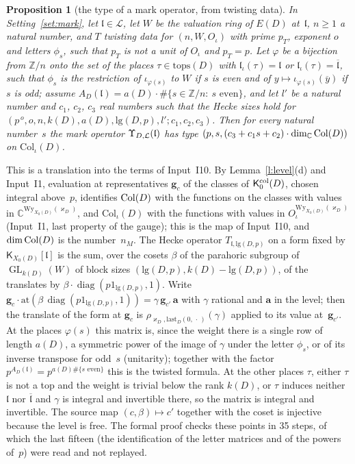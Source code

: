 \documentclass[11pt,a4paper]{article}
\makeatletter
\newcommand{\lean}[1]{\csname LN@#1\endcsname}
\newcommand{\Z}{\mathbb{Z}}
\newcommand{\diag}{\operatorname{diag}}
\newcommand{\leantag}{{\sffamily\bfseries\fontsize{6.3}{8}\selectfont\color{leancol}\addfontfeatures{LetterSpace=7}LEAN}}
\newcommand{\leanline}[1]{\par\nopagebreak\vspace{-2.5pt}{\fontsize{8.9}{12.4}\selectfont\color{inksoft}\raggedright
  \noindent\llap{\leantag\hspace{9pt}}#1\par}\vspace{1pt}}
\theoremstyle{plainx}
\newtheorem{proposition}[theorem]{Proposition}
\theoremstyle{uprightx}
\renewenvironment{proof}[1][Proof]{\par\pushQED{\qed}\normalfont\topsep0pt\partopsep0pt
  \trivlist\item[\hskip\labelsep\itshape #1.]\ignorespaces}{\popQED\endtrivlist\@endpefalse}
\newcommand{\CC}{\mathbb{C}}
\newcommand{\cj}[1]{\overline{#1}}
\newcommand{\GL}{\operatorname{GL}}
\newcommand{\Oj}{O_{\iota}}                                   %
\newcommand{\ED}[1]{E(#1)}
\newcommand{\kD}[1]{k(#1)}
\newcommand{\aD}[1]{a(#1)}
\newcommand{\tops}[1]{\mathrm{tops}(#1)}
\newcommand{\emb}[1]{\iota_{#1}}
\newcommand{\XD}[2]{X_{#2}(#1)}
\newcommand{\rr}[2]{\mathrm{lg}(#1,#2)}
\newcommand{\kapD}[1]{\varkappa_{#1}}
\newcommand{\lastD}[2]{\mathrm{last}_{#1}(#2,\,\cdot\,)}
\newcommand{\ind}[1]{\mathfrak{l}_{\iota}(#1)}
\newcommand{\mexp}[2]{A_{#1}(#2)}
\newcommand{\Colint}[1]{\mathrm{Col}_{\iota}(#1)}
\newcommand{\Wy}[2]{\mathrm{Wy}_{#1}(#2)}
\newcommand{\rhow}[2]{\rho_{#1,#2}}
\newcommand{\Kmax}[2]{\mathsf{K}_{#1}[#2]}
\newcommand{\Tl}[2]{T_{#1,#2}}
\makeatother
\begin{document}
\begin{proposition}[the type of a mark operator, from twisting data]\label{p:typez}
In Setting~\ref{set:mark}, let $\mathfrak{l}\in\mathcal{L}$, let $W$ be the valuation ring of $\ED{D}$
at~$\mathfrak{l}$, $n\ge1$ a natural number, and $T$ twisting data for $(n,W,\Oj)$ with prime $p_T$, exponent
$o$ and letters $\phi_s$, such that $p_T$ is not a unit of\/ $\Oj$ and $p_T=p$. Let $\varphi$ be a bijection from
$\Z/n$ onto the set of the places $\tau\in\tops{D}$ with $\ind{\tau}=\mathfrak{l}$ or
$\ind{\tau}=\cj{\mathfrak{l}}$, such that $\phi_s$ is the restriction of $\emb{\varphi(s)}$ to $W$ if $s$ is even
and of $y\mapsto\emb{\varphi(s)}(\cj{y})$ if $s$ is odd; assume
$\mexp{D}{\mathfrak{l}}=\aD{D}\cdot\#\{s\in\Z/n:\ s\text{ even}\}$, and let $l'$ be a natural number and $c_1$,
$c_2$, $c_3$ real numbers such that the Hecke sizes hold for
$(p^{\,o},o,n,\kD{D},\aD{D},\rr{D}{p},l';c_1,c_2,c_3)$. Then for every natural number~$s$ the mark operator
$\markop{\mathcal{L}}{\mathfrak{l}}$ has type $(p,s,(c_3+c_1s+c_2)\cdot\dim_{\CC}\Col{D})$ on $\Colint{D}$.
\end{proposition}
\begin{proof}
This is a translation into the terms of Input~I10. By Lemma~\ref{l:level}(d) and Input~I1, evaluation at
representatives $\mathbf{g}_c$ of the classes of $\colL{D}{0}$, chosen integral above~$p$, identifies $\Col{D}$ with the
functions on the classes with values in $\CC^{\Wy{\XD{D}{0}}{\kapD{D}}}$, and $\Colint{D}$ with the functions
with values in $\Oj^{\Wy{\XD{D}{0}}{\kapD{D}}}$ (Input~I1, last property of the gauge); this is the map of
Input~I10, and $\dim\Col{D}$ is the number~$n_M$. The Hecke operator $\Tl{\mathfrak{l}}{\rr{D}{p}}$ on a form fixed
by $\Kmax{\XD{D}{0}}{\mathfrak{l}}$ is the sum, over the cosets $\beta$ of the parahoric subgroup of
$\GL_{\kD{D}}(W)$ of block sizes $(\rr{D}{p},\kD{D}-\rr{D}{p})$, of the translates by
$\beta\cdot\diag(p1_{\rr{D}{p}},1)$. Write $\mathbf{g}_c\cdot\mathrm{at}(\beta\,\diag(p1_{\rr{D}{p}},1))=\gamma\,\mathbf{g}_{c'}\,\mathbf{a}$
with $\gamma$ rational and $\mathbf{a}$ in the level; then the translate of the form at $\mathbf{g}_c$ is
$\rhow{\kapD{D}}{\lastD{D}{0}}(\gamma)$ applied to its value at~$\mathbf{g}_{c'}$. At the places $\varphi(s)$ this matrix is,
since the weight there is a single row of length $\aD{D}$, a symmetric power of the image of $\gamma$ under the
letter $\phi_s$, or of its inverse transpose for odd~$s$ (unitarity); together with the factor
$p^{\mexp{D}{\mathfrak{l}}}=p^{\aD{D}\#\{s\text{ even}\}}$ this is the twisted formula. At the other places
$\tau$, either $\tau$ is not a top and the weight is trivial below the rank $\kD{D}$, or $\tau$ induces neither
$\mathfrak{l}$ nor $\cj{\mathfrak{l}}$ and $\gamma$ is integral and invertible there, so the matrix is integral
and invertible. The source map $(c,\beta)\mapsto c'$ together with the coset is injective because the level is
free. The formal proof checks these points in 35 steps, of which the last fifteen (the identification of the
letter matrices and of the powers of~$p$) were read and not replayed.
\end{proof}
\leanline{\lean{hasTypemarkOperatora}}
\end{document}
